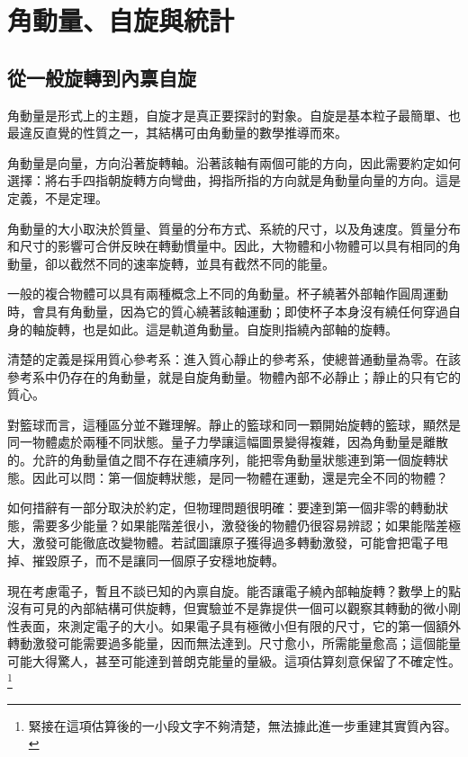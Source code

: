 \chapter{角動量、自旋與統計}

\section{從一般旋轉到內禀自旋}

角動量是形式上的主題，自旋才是真正要探討的對象。自旋是基本粒子最簡單、也最違反直覺的性質之一，其結構可由角動量的數學推導而來。

角動量是向量，方向沿著旋轉軸。沿著該軸有兩個可能的方向，因此需要約定如何選擇：將右手四指朝旋轉方向彎曲，拇指所指的方向就是角動量向量的方向。這是定義，不是定理。

角動量的大小取決於質量、質量的分布方式、系統的尺寸，以及角速度。質量分布和尺寸的影響可合併反映在轉動慣量中。因此，大物體和小物體可以具有相同的角動量，卻以截然不同的速率旋轉，並具有截然不同的能量。

一般的複合物體可以具有兩種概念上不同的角動量。杯子繞著外部軸作圓周運動時，會具有角動量，因為它的質心繞著該軸運動；即使杯子本身沒有繞任何穿過自身的軸旋轉，也是如此。這是軌道角動量。自旋則指繞內部軸的旋轉。

清楚的定義是採用質心參考系：進入質心靜止的參考系，使總普通動量為零。在該參考系中仍存在的角動量，就是自旋角動量。物體內部不必靜止；靜止的只有它的質心。

對籃球而言，這種區分並不難理解。靜止的籃球和同一顆開始旋轉的籃球，顯然是同一物體處於兩種不同狀態。量子力學讓這幅圖景變得複雜，因為角動量是離散的。允許的角動量值之間不存在連續序列，能把零角動量狀態連到第一個旋轉狀態。因此可以問：第一個旋轉狀態，是同一物體在運動，還是完全不同的物體？

如何措辭有一部分取決於約定，但物理問題很明確：要達到第一個非零的轉動狀態，需要多少能量？如果能階差很小，激發後的物體仍很容易辨認；如果能階差極大，激發可能徹底改變物體。若試圖讓原子獲得過多轉動激發，可能會把電子甩掉、摧毀原子，而不是讓同一個原子安穩地旋轉。

現在考慮電子，暫且不談已知的內禀自旋。能否讓電子繞內部軸旋轉？數學上的點沒有可見的內部結構可供旋轉，但實驗並不是靠提供一個可以觀察其轉動的微小剛性表面，來測定電子的大小。如果電子具有極微小但有限的尺寸，它的第一個額外轉動激發可能需要過多能量，因而無法達到。尺寸愈小，所需能量愈高；這個能量可能大得驚人，甚至可能達到普朗克能量的量級。這項估算刻意保留了不確定性。\footnote{緊接在這項估算後的一小段文字不夠清楚，無法據此進一步重建其實質內容。}

